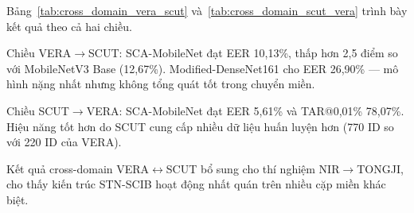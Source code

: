 \documentclass[12pt,a4paper]{article}
\begin{document}
\begin{table}[H]
\caption{Đánh giá cross-domain: SCUT $\rightarrow$ VERA (huấn luyện trên SCUT, kiểm thử trên toàn bộ VERA).}
\begin{center}
\label{tab:cross_domain_scut_vera}
\end{center}
\end{table}

Bảng~\ref{tab:cross_domain_vera_scut} và~\ref{tab:cross_domain_scut_vera} trình bày kết quả theo cả hai chiều.

Chiều VERA$\rightarrow$SCUT: SCA-MobileNet đạt EER 10,13\%, thấp hơn 2,5 điểm so với MobileNetV3 Base (12,67\%). Modified-DenseNet161 cho EER 26,90\% --- mô hình nặng nhất nhưng không tổng quát tốt trong chuyển miền.

Chiều SCUT$\rightarrow$VERA: SCA-MobileNet đạt EER 5,61\% và TAR@0,01\% 78,07\%. Hiệu năng tốt hơn do SCUT cung cấp nhiều dữ liệu huấn luyện hơn (770 ID so với 220 ID của VERA).

Kết quả cross-domain VERA$\leftrightarrow$SCUT bổ sung cho thí nghiệm NIR$\rightarrow$TONGJI, cho thấy kiến trúc STN-SCIB hoạt động nhất quán trên nhiều cặp miền khác biệt.
\end{document}
